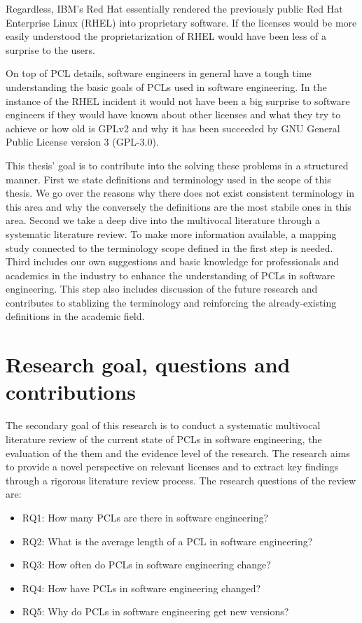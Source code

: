 Regardless, IBM's Red Hat essentially rendered the previously public Red Hat Enterprise Linux (RHEL) into proprietary software. If the licenses would be more easily understood the proprietarization of RHEL would have been less of a surprise to the users.

On top of PCL details, software engineers in general have a tough time understanding the basic goals of PCLs used in software engineering. In the instance of the RHEL incident it would not have been a big surprise to software engineers if they would have known about other licenses and what they try to achieve or how old is GPLv2 and why it has been succeeded by GNU General Public License version 3 (GPL-3.0).

This thesis' goal is to contribute into the solving these problems in a structured manner. First we state definitions and terminology used in the scope of this thesis. We go over the reasons why there does not exist consistent terminology in this area and why the conversely the definitions are the most stabile ones in this area. Second we take a deep dive into the multivocal literature through a systematic literature review. To make more information available, a mapping study connected to the terminology scope defined in the first step is needed. Third includes our own suggestions and basic knowledge for professionals and academics in the industry to enhance the understanding of PCLs in software engineering. This step also includes discussion of the future research and contributes to stablizing the terminology and reinforcing the already-existing definitions in the academic field.

\section{Research goal, questions and contributions}
The secondary goal of this research is to conduct a systematic multivocal literature review of the current state of PCLs in software engineering, the evaluation of the them and the evidence level of the research. The research aims to provide a novel perspective on relevant licenses and to extract key findings through a rigorous literature review process. The research questions of the review are:
\begin{itemize}
	\item RQ1: How many PCLs are there in software engineering?
	\item RQ2: What is the average length of a PCL in software engineering?
	\item RQ3: How often do PCLs in software engineering change?
	\item RQ4: How have PCLs in software engineering changed?
	\item RQ5: Why do PCLs in software engineering get new versions?
\end{itemize}

